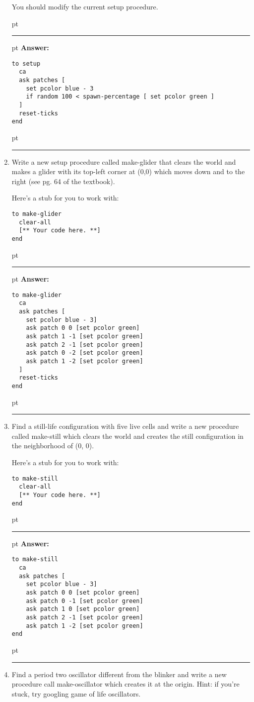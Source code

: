 \documentclass[11pt]{book}
\begin{document}
\begin{enumerate}
You should modify the current setup procedure.

\ifnum{}
 pt
\hrule
{} pt
{\bf Answer: }
\begin{verbatim}
to setup  
  ca
  ask patches [
    set pcolor blue - 3
    if random 100 < spawn-percentage [ set pcolor green ]
  ]
  reset-ticks
end
\end{verbatim}
 pt
\hrule
\fi

\item Write a new setup procedure called make-glider that clears the world and makes a glider with its top-left corner at (0,0) which moves down and to the right (see pg. 64 of the textbook).

Here's a stub for you to work with:
\begin{verbatim}
to make-glider
  clear-all
  [** Your code here. **]
end
\end{verbatim}

\ifnum{}
 pt
\hrule
{} pt
{\bf Answer: }
\begin{verbatim}
to make-glider
  ca 
  ask patches [
    set pcolor blue - 3]
    ask patch 0 0 [set pcolor green]
    ask patch 1 -1 [set pcolor green]
    ask patch 2 -1 [set pcolor green]
    ask patch 0 -2 [set pcolor green]
    ask patch 1 -2 [set pcolor green]
  ]
  reset-ticks
end
\end{verbatim}
 pt
\hrule
\fi

\item Find a still-life configuration with five live cells and write a new procedure called make-still which clears the world and creates the still configuration in the neighborhood of (0, 0).

Here's a stub for you to work with:
\begin{verbatim}
to make-still
  clear-all
  [** Your code here. **]
end
\end{verbatim}

\ifnum{}
 pt
\hrule
{} pt
{\bf Answer: }
\begin{verbatim}
to make-still
  ca 
  ask patches [
    set pcolor blue - 3]
    ask patch 0 0 [set pcolor green]
    ask patch 0 -1 [set pcolor green]
    ask patch 1 0 [set pcolor green]
    ask patch 2 -1 [set pcolor green]
    ask patch 1 -2 [set pcolor green]
end
\end{verbatim}
 pt
\hrule
\fi

\item Find a period two oscillator different from the blinker and write a new procedure call make-oscillator which creates it at the origin. Hint: if you're stuck, try googling game of life oscillators.


\end{enumerate}
\end{document}
